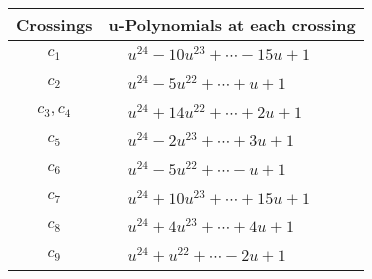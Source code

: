 \documentclass[1p]{elsarticle_modified}
\theoremstyle{definition}
\begin{document}
\begin{tabular}{m{50pt}|m{274pt}}
Crossings & \hspace{64pt}u-Polynomials at each crossing \\
\hline $$\begin{aligned}c_{1}\end{aligned}$$&$\begin{aligned}
&u^{24}-10 u^{23}+\cdots-15 u+1
\end{aligned}$\\
\hline $$\begin{aligned}c_{2}\end{aligned}$$&$\begin{aligned}
&u^{24}-5 u^{22}+\cdots+u+1
\end{aligned}$\\
\hline $$\begin{aligned}c_{3},c_{4}\end{aligned}$$&$\begin{aligned}
&u^{24}+14 u^{22}+\cdots+2 u+1
\end{aligned}$\\
\hline $$\begin{aligned}c_{5}\end{aligned}$$&$\begin{aligned}
&u^{24}-2 u^{23}+\cdots+3 u+1
\end{aligned}$\\
\hline $$\begin{aligned}c_{6}\end{aligned}$$&$\begin{aligned}
&u^{24}-5 u^{22}+\cdots- u+1
\end{aligned}$\\
\hline $$\begin{aligned}c_{7}\end{aligned}$$&$\begin{aligned}
&u^{24}+10 u^{23}+\cdots+15 u+1
\end{aligned}$\\
\hline $$\begin{aligned}c_{8}\end{aligned}$$&$\begin{aligned}
&u^{24}+4 u^{23}+\cdots+4 u+1
\end{aligned}$\\
\hline $$\begin{aligned}c_{9}\end{aligned}$$&$\begin{aligned}
&u^{24}+u^{22}+\cdots-2 u+1
\end{aligned}$\\

\end{tabular}
\end{document}

